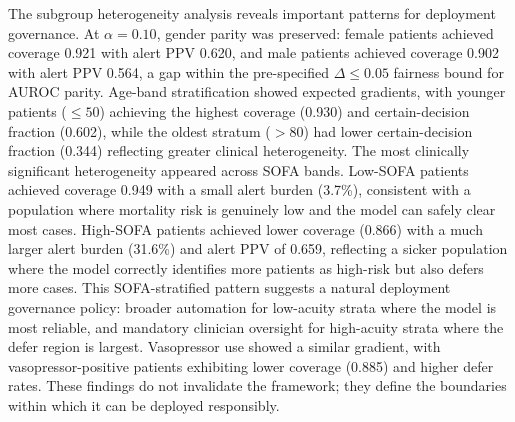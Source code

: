 The subgroup heterogeneity analysis reveals important patterns for deployment governance. At $\alpha = 0.10$, gender parity was preserved: female patients achieved coverage 0.921 with alert PPV 0.620, and male patients achieved coverage 0.902 with alert PPV 0.564, a gap within the pre-specified $\Delta \leq 0.05$ fairness bound for AUROC parity. Age-band stratification showed expected gradients, with younger patients ($\leq 50$) achieving the highest coverage (0.930) and certain-decision fraction (0.602), while the oldest stratum ($> 80$) had lower certain-decision fraction (0.344) reflecting greater clinical heterogeneity. The most clinically significant heterogeneity appeared across SOFA bands. Low-SOFA patients achieved coverage 0.949 with a small alert burden (3.7\%), consistent with a population where mortality risk is genuinely low and the model can safely clear most cases. High-SOFA patients achieved lower coverage (0.866) with a much larger alert burden (31.6\%) and alert PPV of 0.659, reflecting a sicker population where the model correctly identifies more patients as high-risk but also defers more cases. This SOFA-stratified pattern suggests a natural deployment governance policy: broader automation for low-acuity strata where the model is most reliable, and mandatory clinician oversight for high-acuity strata where the defer region is largest. Vasopressor use showed a similar gradient, with vasopressor-positive patients exhibiting lower coverage (0.885) and higher defer rates. These findings do not invalidate the framework; they define the boundaries within which it can be deployed responsibly.


